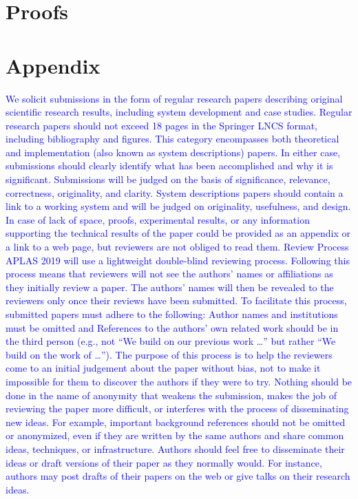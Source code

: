 \documentclass[runningheads]{llncs}
\newcommand{\blue}[1]{\textcolor{blue}{#1 }}
\begin{document}
\iffullversion
\appendix

\newtheorem{ex}{Example}
\newtheorem{cm}{Comment}
\newcommand{\figheader}[2]{
  \begin{flushleft}
    #2 {\bf \normalsize #1}
\end{flushleft}}

\newpage
\section{Proofs}


\fi
\section{Appendix}

\blue{We solicit submissions in the form of regular research papers describing original scientific research results, including system development and case studies. Regular research papers should not exceed 18 pages in the Springer LNCS format, including bibliography and figures. This category encompasses both theoretical and implementation (also known as system descriptions) papers. In either case, submissions should clearly identify what has been accomplished and why it is significant. Submissions will be judged on the basis of significance, relevance, correctness, originality, and clarity. System descriptions papers should contain a link to a working system and will be judged on originality, usefulness, and design. In case of lack of space, proofs, experimental results, or any information supporting the technical results of the paper could be provided as an appendix or a link to a web page, but reviewers are not obliged to read them.}
\blue{Review Process
	APLAS 2019 will use a lightweight double-blind reviewing process. Following this process means that reviewers will not see the authors’ names or affiliations as they initially review a paper. The authors’ names will then be revealed to the reviewers only once their reviews have been submitted.
	To facilitate this process, submitted papers must adhere to the following:
	Author names and institutions must be omitted and
	References to the authors’ own related work should be in the third person (e.g., not “We build on our previous work …” but rather “We build on the work of …”).
	The purpose of this process is to help the reviewers come to an initial judgement about the paper without bias, not to make it impossible for them to discover the authors if they were to try. Nothing should be done in the name of anonymity that weakens the submission, makes the job of reviewing the paper more difficult, or interferes with the process of disseminating new ideas. For example, important background references should not be omitted or anonymized, even if they are written by the same authors and share common ideas, techniques, or infrastructure. Authors should feel free to disseminate their ideas or draft versions of their paper as they normally would. For instance, authors may post drafts of their papers on the web or give talks on their research ideas.}
\end{document}
